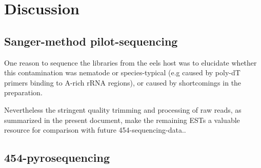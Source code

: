
\chapter{Discussion} %



\ifpdf
    \graphicspath{{7/figures/PNG/}{7/figures/PDF/}{7/figures/}}
\else
    \graphicspath{{7/figures/EPS/}{7/figures/}}
\fi



\section{Sanger-method pilot-sequencing}

One reason to sequence the libraries from the eels host was to
elucidate whether this contamination was nematode or species-typical
(e.g caused by poly-dT primers binding to A-rich rRNA regions), or
caused by shortcomings in the preparation.

Nevertheless the stringent quality trimming and processing of raw
reads, as summarized in the present document, make the remaining ESTs
a valuable resource for comparison with future 454-sequencing-data..




\section{454-pyrosequencing}




